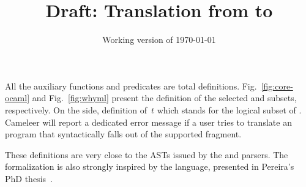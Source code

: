 \documentclass{easychair}
\title{Draft: Translation from \ocaml to \whyml}
\author{}
\date{Working version of \today}
\institute{}
\newcommand{\cameleer}{\textsf{Cameleer}\xspace}
\begin{document}
\maketitle

All the auxiliary functions and predicates are total
definitions. Fig.~\ref{fig:core-ocaml} and Fig.~\ref{fig:whyml} present the
definition of the selected \ocaml and \whyml subsets, respectively. On the
\whyml side, definition of~$t$ which stands for the logical subset of \whyml.
\cameleer will report a dedicated error message if a user tries to translate an
\ocaml program that syntactically falls out of the supported fragment.

{
  These definitions are very close to the ASTs issued by the \ocaml
  and \whyml parsers. The \whyml formalization is also strongly inspired by the
  \kidml language, presented in Pereira's PhD
  thesis~\cite{parreirapereira:tel-01980343}.
}
\end{document}
